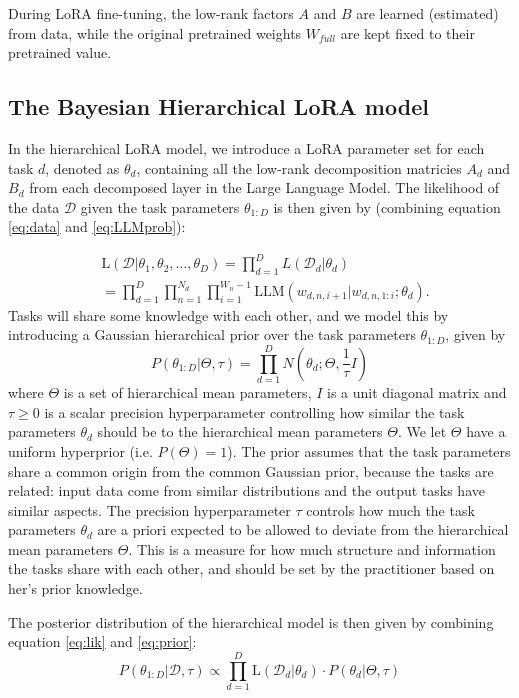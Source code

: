 \documentclass[fullpaper]{nldl}
\begin{document}
During LoRA fine-tuning, the low-rank factors $A$ and $B$ are learned (estimated) from data, while the original pretrained weights $W_{full}$ are kept fixed to their pretrained value.

\subsection{The Bayesian Hierarchical LoRA model} \label{sec:BoRA}
In the hierarchical LoRA model, we introduce a LoRA parameter set for each task $d$, denoted as $\theta_d$, containing all the low-rank decomposition matricies $A_d$ and $B_d$ from each decomposed layer in the Large Language Model. The likelihood of the data $\mathcal{D}$ given the task parameters $\theta_{1:D}$ is then given by (combining equation \ref{eq:data} and \ref{eq:LLMprob}):


\begin{align}  \label{eq:lik}
    & \text{L}(\mathcal{D} | \theta_1, \theta_2, \ldots, \theta_D) = \prod_{d=1}^D L(\mathcal{D}_d | \theta_d) \nonumber \\
    &= \prod_{d=1}^D \prod_{n=1}^{N_d} \prod_{i=1}^{W_n-1} \text{LLM}(w_{d,n,i+1} | w_{d,n,1:i}; \theta_d).
\end{align}
%
%
Tasks will share some knowledge with each other, and we model this by introducing a Gaussian hierarchical prior over the task parameters $\theta_{1:D}$, given by
\begin{equation} \label{eq:prior}
    P(\theta_{1:D} | \Theta, \tau ) = \prod_{d=1}^D N(\theta_d ; \Theta, \frac{1}{\tau} I)
\end{equation}
%
where $\Theta$ is a set of hierarchical mean parameters, $I$ is a unit diagonal matrix and $\tau \geq 0$ is a scalar precision hyperparameter controlling how similar the task parameters $\theta_d$ should be to the hierarchical mean parameters $\Theta$.
We let $\Theta$ have a uniform hyperprior (i.e. $P(\Theta) = 1$). The prior assumes that the task parameters share a common origin from the common Gaussian prior, because the tasks are related: input data come from similar distributions and the output tasks have similar aspects. 
The precision hyperparameter $\tau$ controls how much the task parameters $\theta_d$ are a priori expected to be allowed to deviate from the hierarchical mean parameters $\Theta$. 
This is a measure for how much structure and information the tasks share with each other, and should be set by the practitioner based on her's prior knowledge.

The posterior distribution of the hierarchical model is then given by combining equation \ref{eq:lik} and \ref{eq:prior}:
\begin{equation} \label{eq:posterior}
    P(\theta_{1:D} | \mathcal{D}, \tau) \propto \prod_{d=1}^D \text{L}(\mathcal{D}_d | \theta_d) \cdot P(\theta_d | \Theta, \tau)
\end{equation}
%
%
\end{document}
